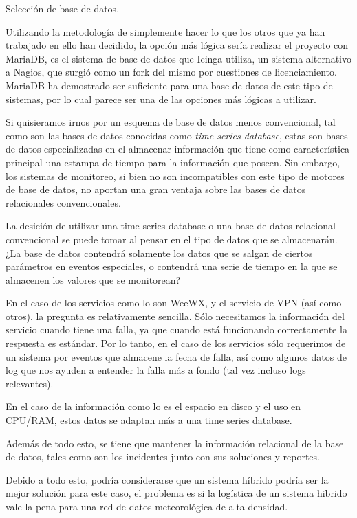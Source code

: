 
Selección de base de datos.

Utilizando la metodología de simplemente hacer lo que los otros que ya han trabajado en ello han decidido, la opción más lógica sería realizar el proyecto con MariaDB, es el sistema de base de datos que Icinga utiliza, un sistema alternativo a Nagios, que surgió como un fork del mismo por cuestiones de licenciamiento. MariaDB ha demostrado ser suficiente para una base de datos de este tipo de sistemas, por lo cual parece ser una de las opciones más lógicas a utilizar.

Si quisieramos irnos por un esquema de base de datos menos convencional, tal como son las bases de datos conocidas como \textit{time series database}, estas son bases de datos especializadas en el almacenar información que tiene como característica principal una estampa de tiempo para la información que poseen. Sin embargo, los sistemas de monitoreo, si bien no son incompatibles con este tipo de motores de base de datos, no aportan una gran ventaja sobre las bases de datos relacionales convencionales.

La desición de utilizar una time series database o una base de datos relacional convencional se puede tomar al pensar en el tipo de datos que se almacenarán. ¿La base de datos contendrá solamente los datos que se salgan de ciertos parámetros en eventos especiales, o contendrá una serie de tiempo en la que se almacenen los valores que se monitorean?

En el caso de los servicios como lo son WeeWX, y el servicio de VPN (así como otros), la pregunta es relativamente sencilla. Sólo necesitamos la información del servicio cuando tiene una falla, ya que cuando está funcionando correctamente la respuesta es estándar. Por lo tanto, en el caso de los servicios sólo requerimos de un sistema por eventos que almacene la fecha de falla, así como algunos datos de log que nos ayuden a entender la falla más a fondo (tal vez incluso logs relevantes).


En el caso de la información como lo es el espacio en disco y el uso en CPU/RAM, estos datos se adaptan más a una time series database.

Además de todo esto, se tiene que mantener la información relacional de la base de datos, tales como son los incidentes junto con sus soluciones y reportes.

Debido a todo esto, podría considerarse que un sistema híbrido podría ser la mejor solución para este caso, el problema es si la logística de un sistema hibrido vale la pena para una red de datos meteorológica de alta densidad.


